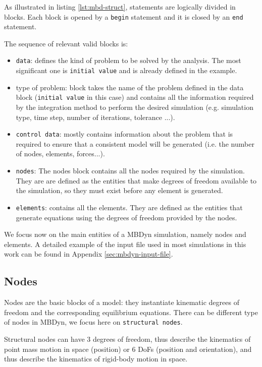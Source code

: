 As illustrated in listing \ref{lst:mbd-struct}, statements are logically divided in blocks. Each block is opened by a \texttt{begin} statement and it is closed by an \texttt{end} statement.

The sequence of relevant valid blocks is:

\begin{itemize}
    \item \texttt{data}: defines the kind of problem to be solved by the analysis. The most significant one is \texttt{initial value} and is already defined in the example. 
    \item type of problem:  block takes the name of the problem defined in the data block (\texttt{initial value} in this case) and contains all the information required by the integration method to perform the desired simulation (e.g. simulation type, time step, number of iterations, tolerance ...).
    \item \texttt{control data}: mostly contains information about the problem that is required to ensure that a consistent model will be generated (i.e. the number of nodes, elements, forces...).
    \item \texttt{nodes}: The nodes block contains all the nodes required by the simulation. They are are defined as the entities that make degrees of freedom available to the simulation, so they must exist before any element is generated.
    \item \texttt{elements}: contains all the elements. They are defined as the entities that generate equations using the degrees of freedom provided by the nodes.
\end{itemize}

We focus now on the main entities of a MBDyn simulation, namely nodes and elements. A detailed example of the input file used in most simulations in this work can be found in Appendix \ref{sec:mbdyn-input-file}.


\subsection{Nodes}
\label{sec:mbd-node}

Nodes are the basic blocks of a model: they instantiate kinematic degrees of freedom and the corresponding equilibrium equations. There can be different type of nodes in MBDyn, we focus here on \texttt{structural nodes}.

Structural nodes can have 3 degrees of freedom, thus describe the kinematics of point mass motion in space  (position) or 6 DoFs (position and orientation), and thus describe the kinematics of rigid-body motion in space.

